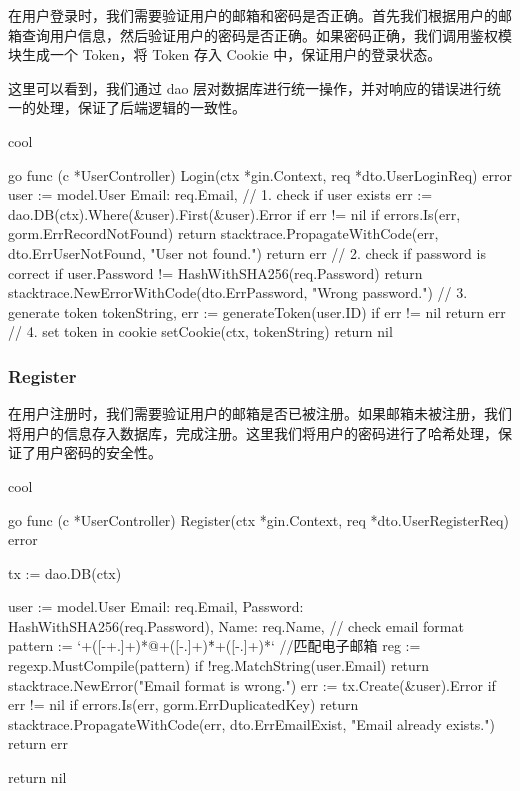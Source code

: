 在用户登录时，我们需要验证用户的邮箱和密码是否正确。首先我们根据用户的邮箱查询用户信息，然后验证用户的密码是否正确。如果密码正确，我们调用鉴权模块生成一个 Token，将 Token 存入 Cookie 中，保证用户的登录状态。

这里可以看到，我们通过 dao 层对数据库进行统一操作，并对响应的错误进行统一的处理，保证了后端逻辑的一致性。

\begin{codebox}{}{cool}
\begin{amzcode}{go}
func (c *UserController) Login(ctx *gin.Context, req *dto.UserLoginReq) error {
	user := model.User{
		Email: req.Email,
	}
	// 1. check if user exists
	err := dao.DB(ctx).Where(&user).First(&user).Error
	if err != nil {
		if errors.Is(err, gorm.ErrRecordNotFound) {
			return stacktrace.PropagateWithCode(err, dto.ErrUserNotFound, "User not found.")
		}
		return err
	}
	// 2. check if password is correct
	if user.Password != HashWithSHA256(req.Password) {
		return stacktrace.NewErrorWithCode(dto.ErrPassword, "Wrong password.")
	}
	// 3. generate token
	tokenString, err := generateToken(user.ID)
	if err != nil {
		return err
	}
	// 4. set token in cookie
	setCookie(ctx, tokenString)
	return nil
}
\end{amzcode}
\end{codebox}

\subsubsection{Register}

在用户注册时，我们需要验证用户的邮箱是否已被注册。如果邮箱未被注册，我们将用户的信息存入数据库，完成注册。这里我们将用户的密码进行了哈希处理，保证了用户密码的安全性。

\begin{codebox}{}{cool}
\begin{amzcode}{go}
func (c *UserController) Register(ctx *gin.Context, req *dto.UserRegisterReq) error {
	tx := dao.DB(ctx)

	user := model.User{
		Email:    req.Email,
		Password: HashWithSHA256(req.Password),
		Name:     req.Name,
	}
	// check email format
	pattern := `\w+([-+.]\w+)*@\w+([-.]\w+)*\.\w+([-.]\w+)*` //匹配电子邮箱
	reg := regexp.MustCompile(pattern)
	if !reg.MatchString(user.Email) {
		return stacktrace.NewError("Email format is wrong.")
	}
	err := tx.Create(&user).Error
	if err != nil {
		if errors.Is(err, gorm.ErrDuplicatedKey) {
			return stacktrace.PropagateWithCode(err, dto.ErrEmailExist, "Email already exists.")
		}
		return err
	}

	return nil
}
\end{amzcode}
\end{codebox}

